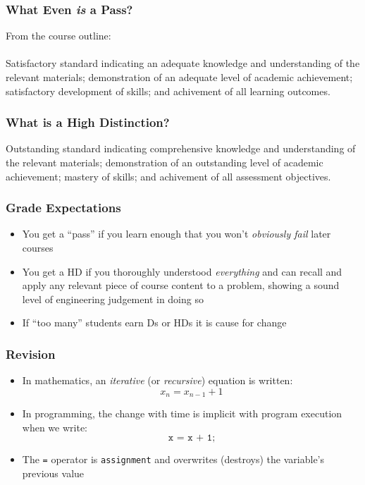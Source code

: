\documentclass[14pt]{beamer}
\begin{document}
\begin{frame}
\frametitle{What Even \textit{is} a Pass?}
From the course outline: \\
~\\
Satisfactory standard indicating an adequate knowledge and understanding of the relevant materials; demonstration of an adequate level of academic achievement; satisfactory development of skills; and achivement of all learning outcomes.
\end{frame}

\begin{frame}
\frametitle{What is a High Distinction?}

Outstanding standard indicating comprehensive knowledge and understanding of the relevant materials; demonstration of an outstanding level of academic achievement; mastery of skills; and achivement of all assessment objectives.
\end{frame}

\begin{frame}
\frametitle{Grade Expectations}
\begin{itemize}
\item You get a ``pass'' if you learn enough that you won't \textit{obviously fail} later courses
\item You get a HD if you thoroughly understood \textit{everything} and can recall and apply any relevant piece of course content to a problem, showing a sound level of engineering judgement in doing so
\item If ``too many'' students earn Ds or HDs it is cause for change
\end{itemize}
\end{frame}

\begin{frame}
\frametitle{Revision}
\begin{itemize}
\item In mathematics, an \textit{iterative} (or \textit{recursive}) equation is written:
\begin{equation}
x_n = x_{n-1} + 1
\end{equation}
\item In programming, the change with time is implicit with program execution when we write:\\
\begin{equation}
\texttt{x = x + 1;}
\end{equation}
\item The \texttt{=} operator is \texttt{assignment} and overwrites (destroys) the variable's previous value
\end{itemize}
\end{frame}
\end{document}
